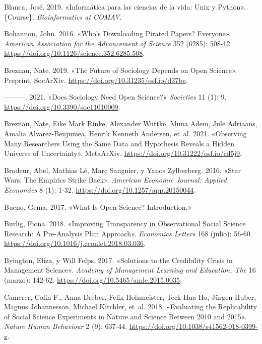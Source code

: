 \documentclass[
  spanish,
  a4paper,
  oneside]{scrbook}
\newlength{\cslhangindent}
\newenvironment{CSLReferences}[2] %
 {\begin{list}{}{%
  \setlength{\itemindent}{0pt}
  \setlength{\leftmargin}{0pt}
  \setlength{\parsep}{0pt}
  \ifodd #1
   \setlength{\leftmargin}{\cslhangindent}
   \setlength{\itemindent}{-1\cslhangindent}
  \fi
  \setlength{\itemsep}{#2\baselineskip}}}
 {\end{list}}
\begin{document}
\begin{CSLReferences}{1}{0}
Blanca, José. 2019. {«{Inform{á}tica para las ciencias de la vida: Unix
y Python}»}. \{Course\}. \emph{Bioinformatics at COMAV}.

Bohannon, John. 2016. {«Who's Downloading Pirated Papers? {Everyone}»}.
\emph{American Association for the Advancement of Science} 352 (6285):
508-12. \url{https://doi.org/10.1126/science.352.6285.508}.

Breznau, Nate. 2019. {«The {Future} of {Sociology Depends} on {Open
Science}»}. Preprint. SocArXiv.
\url{https://doi.org/10.31235/osf.io/d37be}.

---------. 2021. {«Does {Sociology Need Open Science}?»}
\emph{Societies} 11 (1): 9. \url{https://doi.org/10.3390/soc11010009}.

Breznau, Nate, Eike Mark Rinke, Alexander Wuttke, Muna Adem, Jule
Adriaans, Amalia Alvarez-Benjumea, Henrik Kenneth Andersen, et~al. 2021.
{«Observing {Many Researchers Using} the {Same Data} and {Hypothesis
Reveals} a {Hidden Universe} of {Uncertainty}»}. MetaArXiv.
\url{https://doi.org/10.31222/osf.io/cd5j9}.

Brodeur, Abel, Mathias Lé, Marc Sangnier, y Yanos Zylberberg. 2016.
{«Star {Wars}: {The Empirics Strike Back}»}. \emph{American Economic
Journal: Applied Economics} 8 (1): 1-32.
\url{https://doi.org/10.1257/app.20150044}.

Bueno, Gema. 2017. {«What {Is Open Science}? {Introduction}.»}

Burlig, Fiona. 2018. {«Improving Transparency in Observational Social
Science Research: {A} Pre-Analysis Plan Approach»}. \emph{Economics
Letters} 168 (julio): 56-60.
\url{https://doi.org/10.1016/j.econlet.2018.03.036}.

Byington, Eliza, y Will Felps. 2017. {«Solutions to the {Credibility
Crisis} in {Management Science}»}. \emph{Academy of Management Learning
and Education, The} 16 (marzo): 142-62.
\url{https://doi.org/10.5465/amle.2015.0035}.

Camerer, Colin F., Anna Dreber, Felix Holzmeister, Teck-Hua Ho, Jürgen
Huber, Magnus Johannesson, Michael Kirchler, et~al. 2018. {«Evaluating
the Replicability of Social Science Experiments in {Nature} and
{Science} Between 2010 and 2015»}. \emph{Nature Human Behaviour} 2 (9):
637-44. \url{https://doi.org/10.1038/s41562-018-0399-z}.


\end{CSLReferences}
\end{document}
